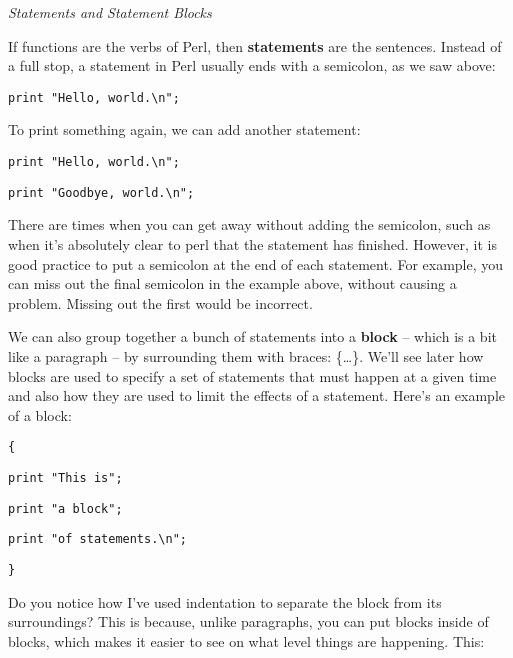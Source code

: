 \documentclass[a4paper,11pt]{book}
\begin{document}
\noindent 

\noindent \textit{Statements and Statement Blocks}

\noindent If functions are the verbs of Perl, then \textbf{statements }are the sentences. Instead of a full stop, a statement in Perl usually ends with a semicolon, as we saw above:

\noindent 

\noindent \texttt{print "Hello, world.\textbackslash n";}

\noindent 

\noindent To print something again, we can add another statement:

\noindent 

\noindent 

\noindent \texttt{print "Hello, world.\textbackslash n";}

\noindent \texttt{print "Goodbye, world.\textbackslash n";}

\noindent 

\noindent There are times when you can get away without adding the semicolon, such as when it's absolutely clear to perl that the statement has finished. However, it is good practice to put a semicolon at the end of each statement. For example, you can miss out the final semicolon in the example above, without causing a problem. Missing out the first would be incorrect.

\noindent 

\noindent We can also group together a bunch of statements into a \textbf{block }-- which is a bit like a paragraph -- by surrounding them with braces: \{\dots \}. We'll see later how blocks are used to specify a set of statements that must happen at a given time and also how they are used to limit the effects of a statement. Here's an example of a block:

\noindent 

\noindent \texttt{\{}

\noindent \texttt{print "This is";}

\noindent \texttt{print "a block";}

\noindent \texttt{print "of statements.\textbackslash n";}

\noindent \texttt{\}}

\noindent 

\noindent Do you notice how I've used indentation to separate the block from its surroundings? This is because, unlike paragraphs, you can put blocks inside of blocks, which makes it easier to see on what level things are happening. This:
\end{document}
